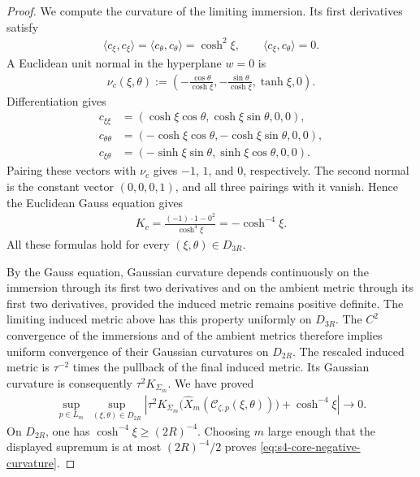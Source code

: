 \documentclass[a4paper,11pt,oneside,reqno]{amsart}
\numberwithin{equation}{section}
\theoremstyle{definition}
\begin{document}
\begin{proof}
    We compute the curvature of the limiting immersion.
    Its first derivatives satisfy
    \begin{align*}
        \langle c_\xi,c_\xi\rangle
        =\langle c_\theta,c_\theta\rangle=\cosh^2\xi,
        \qquad\langle c_\xi,c_\theta\rangle=0.
    \end{align*}
    A Euclidean unit normal in the hyperplane $w=0$ is
    \begin{align*}
        \nu_c(\xi,\theta)
        :=\left(-\frac{\cos\theta}{\cosh\xi},
                -\frac{\sin\theta}{\cosh\xi},
                 \tanh\xi,0\right).
    \end{align*}
    Differentiation gives
    \begin{align*}
        c_{\xi\xi}
        &=(\cosh\xi\cos\theta,\cosh\xi\sin\theta,0,0),\\
        c_{\theta\theta}
        &=(-\cosh\xi\cos\theta,-\cosh\xi\sin\theta,0,0),\\
        c_{\xi\theta}
        &=(-\sinh\xi\sin\theta,\sinh\xi\cos\theta,0,0).
    \end{align*}
    Pairing these vectors with $\nu_c$ gives $-1$, $1$,
    and $0$, respectively. The second normal is the constant
    vector $(0,0,0,1)$, and all three pairings with it vanish.
    Hence the Euclidean Gauss equation gives
    \begin{align*}
        K_c
        =\frac{(-1)\cdot1-0^2}{\cosh^4\xi}
        =-\cosh^{-4}\xi.
    \end{align*}
    All these formulas hold for every $(\xi,\theta)\in D_{3R}$.

    By the Gauss equation, Gaussian curvature depends
    continuously on the immersion through its first two
    derivatives and on the ambient metric through its first
    two derivatives, provided the induced metric remains
    positive definite. The limiting induced metric above
    has this property uniformly on $D_{3R}$. The $C^2$
    convergence of the immersions and of the ambient metrics
    therefore implies uniform convergence of their Gaussian
    curvatures on $D_{2R}$.
    The rescaled induced metric is $\tau^{-2}$ times the
    pullback of the final induced metric. Its Gaussian
    curvature is consequently $\tau^2 K_{\Sigma_m}$.
    We have proved
    \begin{align*}
        \sup_{p\in L_m}\ 
        \sup_{(\xi,\theta)\in D_{2R}}
        \left|\tau^2 K_{\Sigma_m}
          \bigl(\widehat X_m(\mathcal C_{\zeta,p}(\xi,\theta))\bigr)
             +\cosh^{-4}\xi\right|
        \rightarrow0.
    \end{align*}
    On $D_{2R}$, one has $\cosh^{-4}\xi\geq(2R)^{-4}$.
    Choosing $m$ large enough that the displayed supremum
    is at most $(2R)^{-4}/2$ proves
    \eqref{eq:s4-core-negative-curvature}.
\end{proof}
\end{document}
